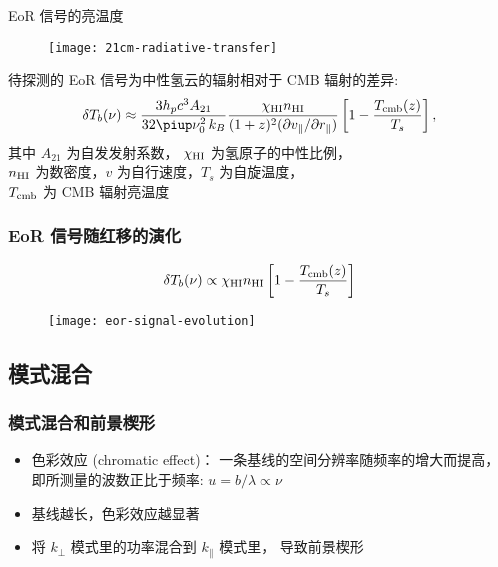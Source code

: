 \documentclass{beamer}
\begin{document}
\begin{frame}{EoR 信号的亮温度}
  \begin{figure}
    \centering
    \texttt{[image: 21cm-radiative-transfer]}
  \end{figure}

  待探测的 \alert{EoR 信号}为中性氢云的辐射相对于 CMB 辐射的\alert{差异}:
  \begin{equation}
    \delta T_b(\nu) \approx
      \frac{3 h_p c^3 A_{21}}{32\Cpi \nu_0^2 \,k_B}
      \frac{\chi_{\R{HI}} n_{\R{HI}}}{
        (1+z)^2 (\partial v_{\parallel} / \partial r_{\parallel})}
      \left[ 1 - \frac{T_{\R{cmb}}(z)}{T_s} \right] ,
  \end{equation}
  其中 $A_{21}$ 为自发发射系数，
  $\chi_{\text{HI}}$ 为氢原子的中性比例， \\
  $n_{\text{HI}}$ 为数密度，$v$ 为自行速度，$T_s$ 为自旋温度，\\
  $T_{\text{cmb}}$ 为 CMB 辐射亮温度

  \vspace*{2em}
\end{frame}

\begin{frame}[subsec]
  \frametitle{EoR 信号随红移的演化}
  \begin{equation}
    \delta T_b(\nu) \propto
      \chi_{\text{HI}} n_{\text{HI}}
      \left[ 1 - \frac{T_{\text{cmb}}(z)}{T_s} \right]
  \end{equation}

  \begin{figure}
    \centering
    \texttt{[image: eor-signal-evolution]}
  \end{figure}

\end{frame}

\subsection{模式混合}

\begin{frame}[subsec]
  \frametitle{模式混合和前景楔形}
  \begin{itemize}
    \item \alert{色彩效应 (chromatic effect)}：
      一条基线的空间分辨率随频率的增大而提高，
      即所测量的波数正比于频率: $u = b/\lambda \propto \nu$
    \item 基线越长，色彩效应越显著
    \item 将 $k_{\perp}$ 模式里的功率\alert{混合}到 $k_{\parallel}$ 模式里，
      导致\alert{前景楔形}
  \end{itemize}

  \vspace{-1ex}
\end{frame}
\end{document}

